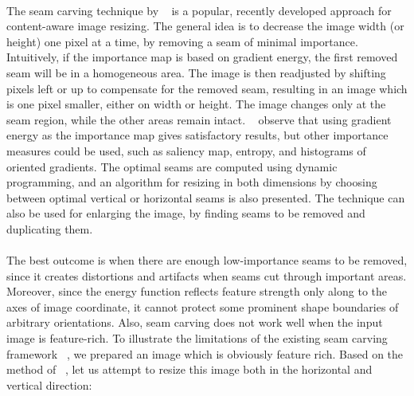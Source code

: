\documentclass[conference]{acmsiggraph}
\begin{document}
\paragraph{}
The seam carving technique by ~\cite{Avidan2007} is a popular, recently developed approach for content-aware image resizing. The general idea is to decrease the image width (or height) one pixel at a time,  by removing a seam of minimal importance. Intuitively, if the importance map is based on gradient energy, the first removed seam will be in a homogeneous area. The image is then readjusted by shifting pixels left or up to compensate for the removed seam, resulting in an image which is one pixel smaller, either on width or height. The image changes only at the seam region, while the other areas remain intact. ~\cite{Avidan2007} observe that using gradient energy as the importance map gives satisfactory results, but other importance measures could be used, such as saliency map, entropy, and histograms of oriented gradients. The optimal seams are computed using dynamic programming, and an algorithm for resizing in both dimensions by choosing between optimal vertical or horizontal seams is also presented. The technique can also be used for enlarging the image, by finding seams to be removed and duplicating them. 

\paragraph{}
The best outcome is when there are enough low-importance seams to be removed, since it creates distortions and artifacts when seams cut through important areas. Moreover, since the energy function reflects feature strength only along to the axes  of image coordinate, it cannot protect some prominent shape boundaries of arbitrary orientations. Also, seam carving does not work well when the input image is feature-rich. To illustrate the limitations of the existing seam carving framework ~\cite{Avidan2007}, we prepared an image which is obviously feature rich. Based on the method of ~\cite{Avidan2007}, let us attempt to resize this image both in the horizontal and vertical direction:
\end{document}
